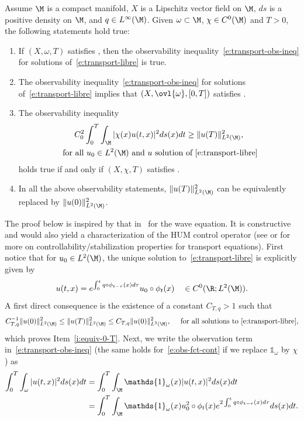 \begin{proposition}
Assume $\M$ is a compact manifold, $X$ is a Lipschitz vector field on $\M$, $ds$ is a positive density on $\M$, and $q \in L^\infty(\M)$.
Given $\omega \subset \M$, $\chi \in C^0(\M)$ and $T>0$, the following statements hold true:
\begin{enumerate}
\item \label{i:GCC-obs} If $(X,\omega,T)$ satisfies \pGCC, then the observability inequality~\eqref{e:transport-obs-ineq} for solutions of~\eqref{e:transport-libre} is true.
\item \label{i:obs-GCC} The observability inequality~\eqref{e:transport-obs-ineq} for solutions of~\eqref{e:transport-libre} implies that $(X,\ovl{\omega},[0,T])$ satisfies \pGCC.
\item \label{i:obs-GCC-cont} The observability inequality
\begin{multline}
\label{e:obs-fct-cont}
C_0^2 \int_0^T\int_\M |\chi(x) u(t,x)|^2 ds(x)dt \geq \|u (T)\|_{L^2(\M)}^2, \\
\text{ for all } u_0 \in L^2(\M) \text{ and } u \text{ solution of~\eqref{e:transport-libre}}
\end{multline}
holds true if and only if $(X,\chi,T)$ satisfies \pGCC.
\item \label{i:equiv-0-T} In all the above observability statements, $\|u (T)\|_{L^2(\M)}^2$ can be equivalently repla\-ced by $\|u (0)\|_{L^2(\M)}^2$.
\end{enumerate}
\end{proposition}
The proof below is inspired by that in~\cite{DL:09,LL:16} for the wave equation. It is constructive and would also yield a characterization of the HUM control operator (see \eg \cite{HKL:15} or \cite[\S 1.2]{Lea:18} for more on controllability/stabilization properties for transport equations).
\bnp
First notice that for $u_0 \in L^2(\M)$, the unique solution to~\eqref{e:transport-libre} is explicitly given by
\[
u(t,x) = e^{\int_0^tq \circ\phi_{t-\tau}(x)d\tau}u_0\circ \phi_t(x) \quad \in C^0(\R ; L^2(\M)).
\]
A first direct consequence is the existence of a constant $C_{T,q}>1$ such that
\[
C_{T,q}^{-1} \|u (0)\|_{L^2(\M)}^2\leq \|u (T)\|_{L^2(\M)}^2 \leq C_{T,q} \|u (0)\|_{L^2(\M)}^2, \quad \text{ for all solutions to~\eqref{e:transport-libre}},
\]
which proves Item~\eqref{i:equiv-0-T}. Next, we write the observation term in~\eqref{e:transport-obs-ineq} (the same holds for~\eqref{e:obs-fct-cont} if we replace $\mathds{1}_\omega$ by $\chi$) as
\begin{align*}
\int_0^T\int_\omega |u(t,x)|^2 ds(x)dt & = \int_0^T\int_\M \mathds{1}_\omega(x) |u(t,x)|^2 ds(x)dt \\
& = \int_0^T\int_\M \mathds{1}_\omega(x) u_0^2\circ \phi_t(x) e^{2\int_0^tq \circ\phi_{t-\tau}(x)d\tau} ds(x)dt.
\end{align*}
